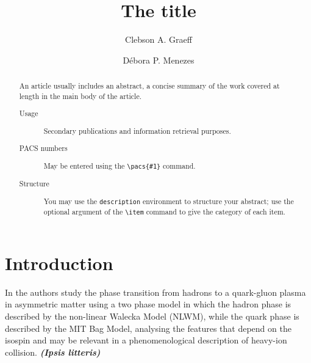 \documentclass[prc, reprint, amsmath, floatfix, linenumbers,10pt]{revtex4-1}
\newcommand{\comment}[1]{{\bf\textit{#1}}}
\begin{document}

%
%

\title{The title}

\author{Clebson A. Graeff}

\author{Débora P. Menezes}


\begin{abstract}
An article usually includes an abstract, a concise summary of the work
covered at length in the main body of the article. 
\begin{description}
\item[Usage]
Secondary publications and information retrieval purposes.
\item[PACS numbers]
May be entered using the \verb+\pacs{#1}+ command.
\item[Structure]
You may use the \texttt{description} environment to structure your abstract;
use the optional argument of the \verb+\item+ command to give the category of each item. 
\end{description}
\end{abstract}




\maketitle

%
%

\section{Introduction}

In \cite{Cavagnoli2011} the authors study the phase transition from hadrons to a quark-gluon plasma in asymmetric matter using a two phase model in which the hadron phase is described by the non-linear Walecka Model (NLWM), while the quark phase is described by the MIT Bag Model, analysing the features that depend on the isospin and may be relevant in a phenomenological description of heavy-ion collision. \comment{(Ipsis litteris)}
\end{document}
